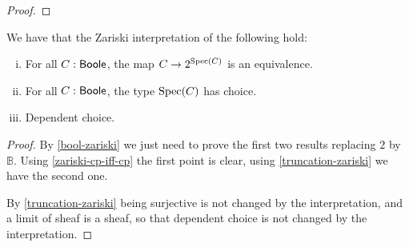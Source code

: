 \begin{proof}
\end{proof}

\begin{theorem}\label{zariski-sheaf-axioms}
We have that the Zariski interpretation of the following hold:
\begin{enumerate}[(i)]
\item For all $C:\mathsf{Boole}$, the map $C\to {2}^{\operatorname{Spec}(C)}$ is an equivalence.
\item For all $C:\mathsf{Boole}$, the type $\operatorname{Spec}(C)$ has choice.
\item Dependent choice.
\end{enumerate}
\end{theorem}

\begin{proof}
By \cref{bool-zariski} we just need to prove the first two results replacing ${2}$ by $\mathbb{B}$. Using \cref{zariski-cp-iff-cp} the first point is clear, using \cref{truncation-zariski} we have the second one.

By \cref{truncation-zariski} being surjective is not changed by the interpretation, and a limit of sheaf is a sheaf, so that dependent choice is not changed by the interpretation.
\end{proof}


